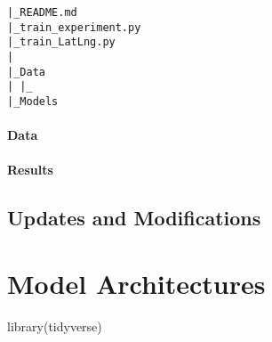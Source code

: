 \documentclass[
]{book}
\newenvironment{Shaded}{\begin{snugshade}}{\end{snugshade}}
\newcommand{\FunctionTok}[1]{\textcolor[rgb]{0.00,0.00,0.00}{#1}}
\newcommand{\NormalTok}[1]{#1}
\begin{document}
\begin{verbatim}
|_README.md
|_train_experiment.py
|_train_LatLng.py
|
|_Data
| |_
|_Models
\end{verbatim}

\hypertarget{data}{%
\subsubsection{Data}\label{data}}

\hypertarget{results}{%
\subsubsection{Results}\label{results}}

\hypertarget{updates-and-modifications}{%
\section{Updates and Modifications}\label{updates-and-modifications}}

\hypertarget{methods}{%
\chapter{Model Architectures}\label{methods}}

\begin{Shaded}
\begin{Highlighting}[]
\FunctionTok{library}\NormalTok{(tidyverse)}
\end{Highlighting}
\end{Shaded}
\end{document}
